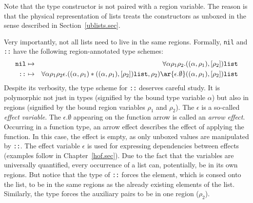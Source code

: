 \documentclass[12pt]{book}
\begin{document}
Note that the  type constructor is not paired with a
region variable.  The reason is that the physical representation of
lists treats the constructors as unboxed in the sense described in
Section~\ref{ublists.sec}.

Very importantly, not all lists need to live in the same regions.
Formally, {\tt nil} and {\tt ::} have the following region-annotated
type schemes:
\begin{eqnarray*}
\boxml{nil} & \mapsto & \forall\alpha\rho_1\rho_2.((\alpha,\rho_1),[\rho_2])\boxml{list}\\
\boxml{::}  & \mapsto & \forall\alpha\rho_1\rho_2\epsilon.((\alpha,\rho_1)\ast((\alpha,\rho_1),[\rho_2])\boxml{list},\rho_2)
\ar{\epsilon.\emptyset} ((\alpha,\rho_1),[\rho_2])\boxml{list}
\end{eqnarray*}
Despite its verbosity, the type scheme for {\tt ::} deserves careful
study. It is polymorphic not just in types (signified by the bound
type variable $\alpha$) but also in regions (signified by the bound
region variables $\rho_1$ and $\rho_2$). The $\epsilon$ is a so-called
%
{\em effect variable}. 
The $\epsilon.\emptyset$ appearing on the function arrow is called an 
%
{\em arrow effect}.  Occurring in a function type, an arrow effect
describes the effect of applying the function.  In this case, the
effect is empty, as only unboxed values are manipulated by {\tt ::}.
The effect variable $\epsilon$ is used for expressing dependencies
between effects (examples follow in Chapter~\ref{hof.sec}). Due to the
fact that the variables are universally quantified, every occurrence
of a list can, potentially, be in its own regions. But notice that the
type of {\tt ::} forces the element, which is consed onto the list, to
be in the same regions as the already existing elements of the list.
Similarly, the type forces the auxiliary pairs to be in one region
($\rho_2$).
\end{document}
